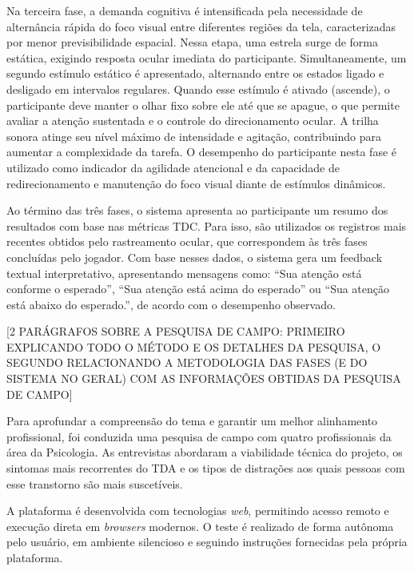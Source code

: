 Na terceira fase, a demanda cognitiva é intensificada pela necessidade de alternância rápida do foco visual entre diferentes regiões da tela, caracterizadas por menor previsibilidade espacial. Nessa etapa, uma estrela surge de forma estática, exigindo resposta ocular imediata do participante. Simultaneamente, um segundo estímulo estático é apresentado, alternando entre os estados ligado e desligado em intervalos regulares. Quando esse estímulo é ativado (ascende), o participante deve manter o olhar fixo sobre ele até que se apague, o que permite avaliar a atenção sustentada e o controle do direcionamento ocular. A trilha sonora atinge seu nível máximo de intensidade e agitação, contribuindo para aumentar a complexidade da tarefa. O desempenho do participante nesta fase é utilizado como indicador da agilidade atencional e da capacidade de redirecionamento e manutenção do foco visual diante de estímulos dinâmicos.

Ao término das três fases, o sistema apresenta ao participante um resumo dos resultados com base nas métricas TDC. Para isso, são utilizados os registros mais recentes obtidos pelo rastreamento ocular, que correspondem às três fases concluídas pelo jogador. Com base nesses dados, o sistema gera um feedback textual interpretativo, apresentando mensagens como: “Sua atenção está conforme o esperado”, “Sua atenção está acima do esperado” ou “Sua atenção está abaixo do esperado.”, de acordo com o desempenho observado.

[2 PARÁGRAFOS SOBRE A PESQUISA DE CAMPO: PRIMEIRO EXPLICANDO TODO O MÉTODO E OS DETALHES DA PESQUISA, O SEGUNDO RELACIONANDO A METODOLOGIA DAS FASES (E DO SISTEMA NO GERAL) COM AS INFORMAÇÕES OBTIDAS DA PESQUISA DE CAMPO]

Para aprofundar a compreensão do tema e garantir um melhor alinhamento profissional, foi conduzida uma pesquisa de campo com quatro profissionais da área da Psicologia. As entrevistas abordaram a viabilidade técnica do projeto, os sintomas mais recorrentes do TDA e os tipos de distrações aos quais pessoas com esse transtorno são mais suscetíveis.

A plataforma é desenvolvida com tecnologias \textit{web}, permitindo acesso remoto e execução
direta em \textit{browsers} modernos. O teste é realizado de forma autônoma pelo usuário, em ambiente silencioso e seguindo instruções fornecidas pela própria plataforma.


